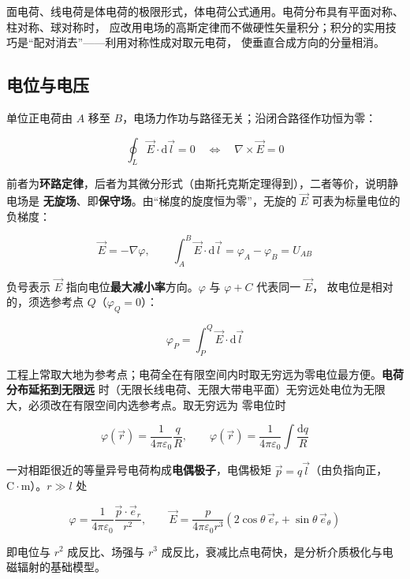 面电荷、线电荷是体电荷的极限形式，体电荷公式通用。电荷分布具有平面对称、柱对称、球对称时，
应改用电场的高斯定律而不做硬性矢量积分；积分的实用技巧是“配对消去”——利用对称性成对取元电荷，
使垂直合成方向的分量相消。

\subsection{电位与电压}

单位正电荷由 $A$ 移至 $B$，电场力作功与路径无关；沿闭合路径作功恒为零：
\begin{formulaBox}
\[
\oint_L\vec{E}\cdot\mathrm{d}\vec{l}=0
\quad\Longleftrightarrow\quad
\nabla\times\vec{E}=0
\]
\end{formulaBox}

前者为\textbf{环路定律}，后者为其微分形式（由斯托克斯定理得到），二者等价，说明静电场是
\textbf{无旋场}、即\textbf{保守场}。由“梯度的旋度恒为零”，无旋的 $\vec{E}$ 可表为标量电位的负梯度：
\begin{formulaBox}
\[
\vec{E}=-\nabla\varphi,
\qquad
\int_A^B\vec{E}\cdot\mathrm{d}\vec{l}=\varphi_A-\varphi_B=U_{AB}
\]
\end{formulaBox}

负号表示 $\vec{E}$ 指向电位\textbf{最大减小率}方向。$\varphi$ 与 $\varphi+C$ 代表同一 $\vec{E}$，
故电位是相对的，须选参考点 $Q$（$\varphi_Q=0$）：
\begin{formulaBox}
\[
\varphi_P=\int_P^{Q}\vec{E}\cdot\mathrm{d}\vec{l}
\]
\end{formulaBox}

工程上常取大地为参考点；电荷全在有限空间内时取无穷远为零电位最方便。\textbf{电荷分布延拓到无限远}
时（无限长线电荷、无限大带电平面）无穷远处电位为无限大，必须改在有限空间内选参考点。取无穷远为
零电位时
\begin{formulaBox}
\[
\varphi(\vec{r})=\frac{1}{4\pi\varepsilon_0}\frac{q}{R},
\qquad
\varphi(\vec{r})=\frac{1}{4\pi\varepsilon_0}\int\frac{\mathrm{d}q}{R}
\]
\end{formulaBox}

一对相距很近的等量异号电荷构成\textbf{电偶极子}，电偶极矩 $\vec{p}=q\vec{l}$（由负指向正，
$\mathrm{C\cdot m}$）。$r\gg l$ 处
\begin{formulaBox}
\[
\varphi=\frac{1}{4\pi\varepsilon_0}\frac{\vec{p}\cdot\vec{e}_r}{r^2},
\qquad
\vec{E}=\frac{p}{4\pi\varepsilon_0r^3}\left(2\cos\theta\,\vec{e}_r+\sin\theta\,\vec{e}_\theta\right)
\]
\end{formulaBox}

即电位与 $r^2$ 成反比、场强与 $r^3$ 成反比，衰减比点电荷快，是分析介质极化与电磁辐射的基础模型。

